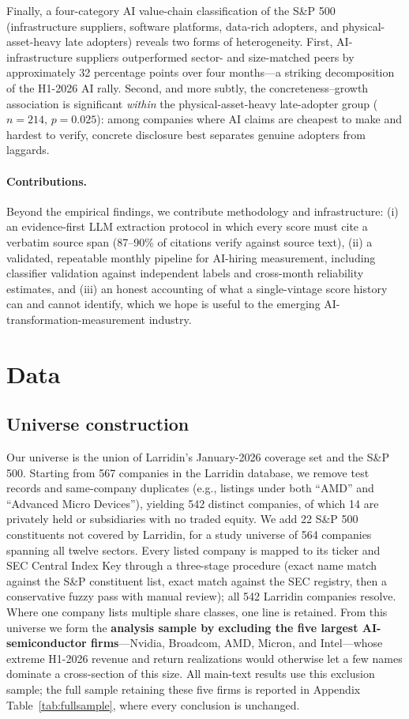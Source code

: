 \documentclass[11pt]{article}
\begin{document}
Finally, a four-category AI value-chain classification of the S\&P 500
(infrastructure suppliers, software platforms, data-rich adopters, and
physical-asset-heavy late adopters) reveals two forms of heterogeneity. First,
AI-infrastructure suppliers outperformed sector- and size-matched peers by
approximately 32 percentage points over four months---a striking decomposition
of the H1-2026 AI rally. Second, and more subtly, the concreteness--growth
association is significant \emph{within} the physical-asset-heavy late-adopter
group ($n=214$, $p=0.025$): among companies where AI claims are cheapest to
make and hardest to verify, concrete disclosure best separates genuine adopters
from laggards.

\paragraph{Contributions.} Beyond the empirical findings, we contribute
methodology and infrastructure: (i) an evidence-first LLM extraction protocol
in which every score must cite a verbatim source span (87--90\% of citations
verify against source text), (ii) a validated, repeatable monthly pipeline for
AI-hiring measurement, including classifier validation against independent
labels and cross-month reliability estimates, and (iii) an honest accounting of
what a single-vintage score history can and cannot identify, which we hope is
useful to the emerging AI-transformation-measurement industry.

\section{Data}
\label{sec:data}

\subsection{Universe construction}

Our universe is the union of Larridin's January-2026 coverage set and the S\&P
500. Starting from 567 companies in the Larridin database, we remove test
records and same-company duplicates (e.g., listings under both ``AMD'' and
``Advanced Micro Devices''), yielding 542 distinct companies, of which 14 are
privately held or subsidiaries with no traded equity. We add 22 S\&P 500
constituents not covered by Larridin, for a study universe of 564 companies
spanning all twelve sectors. Every listed company is mapped to its ticker and
SEC Central Index Key through a three-stage procedure (exact name match against
the S\&P constituent list, exact match against the SEC registry, then a
conservative fuzzy pass with manual review); all 542 Larridin companies
resolve. Where one company lists multiple share classes, one line is retained. From
this universe we form the \textbf{analysis sample by excluding the five largest
AI-semiconductor firms}---Nvidia, Broadcom, AMD, Micron, and Intel---whose
extreme H1-2026 revenue and return realizations would otherwise let a few names
dominate a cross-section of this size. All main-text results use this exclusion
sample; the full sample retaining these five firms is reported in Appendix
Table~\ref{tab:fullsample}, where every conclusion is unchanged.
\end{document}
